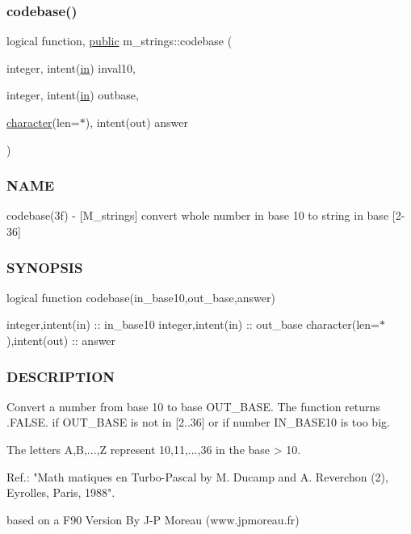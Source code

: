 \subsubsection{\texorpdfstring{codebase()}{codebase()}}
{\footnotesize\ttfamily logical function, \hyperlink{M__stopwatch_83_8txt_a2f74811300c361e53b430611a7d1769f}{public} m\+\_\+strings\+::codebase (\begin{DoxyParamCaption}\item[{integer, intent(\hyperlink{M__journal_83_8txt_afce72651d1eed785a2132bee863b2f38}{in})}]{inval10,  }\item[{integer, intent(\hyperlink{M__journal_83_8txt_afce72651d1eed785a2132bee863b2f38}{in})}]{outbase,  }\item[{\hyperlink{option__stopwatch_83_8txt_abd4b21fbbd175834027b5224bfe97e66}{character}(len=$\ast$), intent(out)}]{answer }\end{DoxyParamCaption})}



\subsubsection*{N\+A\+ME}

codebase(3f) -\/ \mbox{[}M\+\_\+strings\mbox{]} convert whole number in base 10 to string in base \mbox{[}2-\/36\mbox{]}

\subsubsection*{S\+Y\+N\+O\+P\+S\+IS}

logical function codebase(in\+\_\+base10,out\+\_\+base,answer)

integer,intent(in) \+:\+: in\+\_\+base10 integer,intent(in) \+:\+: out\+\_\+base character(len=$\ast$),intent(out) \+:\+: answer

\subsubsection*{D\+E\+S\+C\+R\+I\+P\+T\+I\+ON}

\begin{DoxyVerb}Convert a number from base 10 to base OUT_BASE. The function returns
.FALSE. if OUT_BASE is not in [2..36] or if number IN_BASE10 is
too big.

The letters A,B,...,Z represent 10,11,...,36 in the base > 10.

   Ref.: "Math matiques en Turbo-Pascal by
          M. Ducamp and A. Reverchon (2),
          Eyrolles, Paris, 1988".

based on a F90 Version By J-P Moreau (www.jpmoreau.fr)
\end{DoxyVerb}


